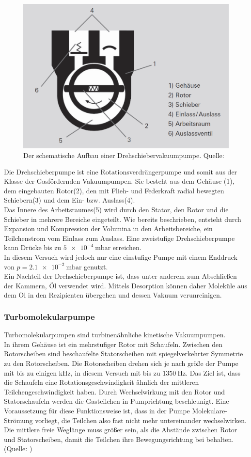 			\begin{figure}
				\centering
				\includegraphics[width=0.5\linewidth]{"latex/images/Drehschieber.png"}
				\caption{Der schematische Aufbau einer Drehschiebervakuumpumpe. \protect Quelle: \cite{pfeiffer:pump}}
				\label{fig:dreh}
			\end{figure}  

			\noindent
			Die Drehschieberpumpe ist eine Rotationsverdrängerpumpe und somit aus der Klasse der Gasfördernden Vakuumpumpen.
			Sie besteht aus dem Gehäuse (1), dem eingebauten Rotor(2), den mit Flieh- und Federkraft radial bewegten Schiebern(3) und dem Ein- bzw. Auslass(4).\\ 
			Das Innere des Arbeitsraumes(5) wird durch den Stator, den Rotor und die Schieber in mehrere Bereiche eingeteilt. 
			Wie bereits beschrieben, entsteht durch Expansion und Kompression der Volumina in den Arbeitsbereiche, ein Teilchenstrom vom Einlass zum Auslass. 
			Eine zweistufige Drehschieberpumpe kann Drücke bis zu $\SI{5e-4}{\milli\bar}$ erreichen. \\
			In diesem Versuch wird jedoch nur eine einstufige Pumpe mit einem Enddruck von $p = \SI{2.1 e-2}{\milli\bar}$ genutzt.\\
			Ein Nachteil der Drehschieberpumpe ist, dass unter anderem zum Abschließen der Kammern, Öl verwendet wird.
			Mittels Desorption können daher Moleküle aus dem Öl in den Rezipienten übergehen und dessen Vakuum verunreinigen.	 

		\subsubsection{Turbomolekularpumpe}
		
			\noindent
			Turbomolekularpumpen sind turbinenähnliche kinetische Vakuumpumpen.\\ 
			In ihrem Gehäuse ist ein mehrstufiger Rotor mit Schaufeln.
			Zwischen den Rotorscheiben sind beschaufelte Statorscheiben mit spiegelverkehrter Symmetrie zu den Rotorscheiben.
			Die Rotorscheiben drehen sich je nach größe der Pumpe mit bis zu einigen kHz, in diesem Versuch mit bis zu $\SI{1350}{\hertz}$.
			Das Ziel ist, dass die Schaufeln eine Rotationsgeschwindigkeit ähnlich der mittleren Teilchengeschwindigkeit haben.
			Durch Wechselwirkung mit den Rotor und Statorschaufeln werden die Gasteilchen in Pumprichtung beschleunigt.
			Eine Voraussetzung für diese Funktionsweise ist, dass in der Pumpe Molekulare-Strömung vorliegt, die Teilchen also fast nicht mehr untereinander wechselwirken.
			Die mittlere freie Weglänge muss größer sein, als die Abstände zwischen Rotor und Statorscheiben, damit die Teilchen ihre Bewegungsrichtung bei behalten.\\
			(Quelle: \cite{pfeiffer:pump})
			  					
